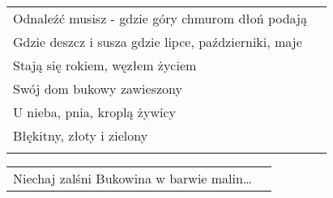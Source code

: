 \documentclass[a5paper]{article}
\begin{document}
\noindent
\begin{tabular}{@{}p{8.5cm}p{3cm}@{}}
Odnaleźć musisz - gdzie góry chmurom dłoń podają \\
Gdzie deszcz i susza gdzie lipce, październiki, maje \\
Stają się rokiem, węzłem życiem \\
Swój dom bukowy zawieszony \\
U nieba, pnia, kroplą żywicy \\
Błękitny, złoty i zielony \\ \\
\end{tabular}

\noindent
\begin{tabular}{@{}p{8.5cm}p{3cm}@{}}
Niechaj zalśni Bukowina w barwie malin…
\end{tabular}
\end{document}
